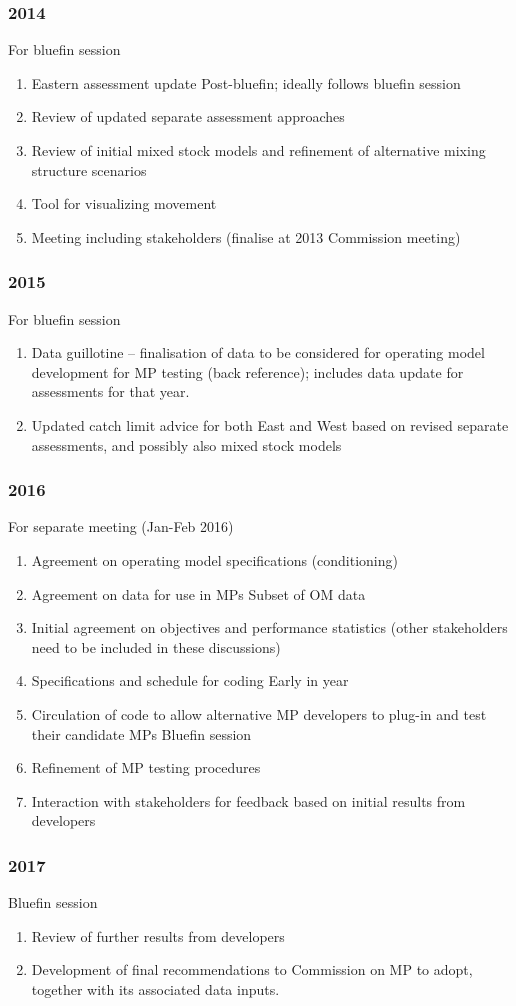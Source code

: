 \subsubsection*{2014} 

For bluefin session
\begin{enumerate}
\item Eastern assessment update 
Post-bluefin; ideally follows bluefin session
\item Review of updated separate assessment approaches
\item Review of initial mixed stock models and refinement of alternative mixing structure scenarios
\item Tool for visualizing movement
\item Meeting including stakeholders (finalise at 2013 Commission meeting)
\end{enumerate}

\subsubsection*{2015}


For bluefin session
\begin{enumerate}
\item Data guillotine – finalisation of data to be considered for operating model development for MP testing (back reference); includes data update for assessments for that year.
\item Updated catch limit advice for both East and West based on revised separate assessments, and possibly also mixed stock models
\end{enumerate}

\subsubsection*{2016}

For separate meeting (Jan-Feb 2016)
\begin{enumerate}
\item Agreement on operating model specifications (conditioning)
\item Agreement on data for use in MPs
Subset of OM data
\item Initial agreement on objectives and performance statistics (other stakeholders need to be included in these discussions)
\item Specifications and schedule for coding
Early in year
\item Circulation of code to allow alternative MP developers to plug-in and test their candidate MPs
Bluefin session
\item Refinement of MP testing procedures
\item Interaction with stakeholders for feedback based on initial results from developers
\end{enumerate}

\subsubsection*{2017}

Bluefin session
\begin{enumerate}
\item Review of further results from developers
\item Development of final recommendations to Commission on MP to adopt, together with its associated data inputs.
\end{enumerate}

